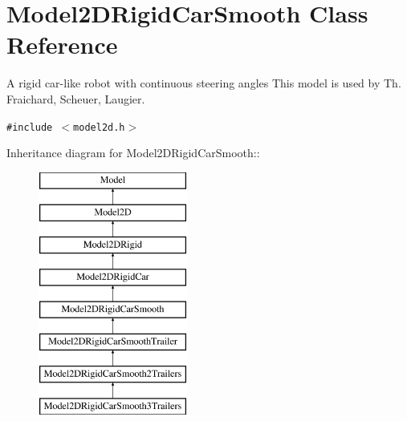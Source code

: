 \section{Model2DRigid\-Car\-Smooth  Class Reference}
\label{class_Model2DRigidCarSmooth}
A rigid car-like robot with continuous steering angles This model is used by Th. Fraichard, Scheuer, Laugier. 


{\tt \#include $<$model2d.h$>$}

Inheritance diagram for Model2DRigid\-Car\-Smooth::\begin{figure}[H]
\begin{center}
\leavevmode
\includegraphics[height=8cm]{class_Model2DRigidCarSmooth}
\end{center}
\end{figure}
